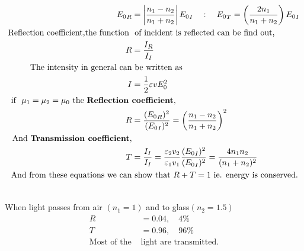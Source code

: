 \begin{align}
{E_0}_R&=\left| \frac{n_1-n_2}{n_1+n_2}\right| {E_0}_I\quad:\quad {E_0}_T=\left(\frac{2n_1}{n_1+n_2} \right) {E_0}_I\\
\text{Reflection coefficient,the function }&\text{ of incident is reflected can be find out,}\\
R&=\frac{I_R}{I_I}\\
\text{The intensity in general can}&\text{ be written as}\\
I&=\frac{1}{2}\varepsilon v E_0^2\\
\text{if \ $ \mu_{1}=\mu_{2}=\mu_{0} $ the \textbf{Reflection }}&\textbf{coefficient},\\
R&=\frac{({E_0}_R)^2}{({E_0}_I)^2}=\left(\frac{n_1-n_2}{n_1+n_2} \right)^2 \\ 
\text{And \textbf{Transmission coefficient},}\\
T&=\frac{I_I}{I_I}=\frac{\varepsilon_2v_2}{\varepsilon_1v_1}\frac{({E_0}_I)^2}{({E_0}_I)^2}=\frac{4n_1n_2}{(n_1+n_2)^2}\\
\text{And from these equations we can}&\text{ show that $R+T=1$ ie. energy is conserved.}\notag
\end{align}
\hspace{5.10cm}

\begin{note}\\\vspace{0.5cm}
	When light passes from air $(n_1=1)$ and to glass$(n_2=1.5)$
	\begin{align*}
	R&=0.04,\quad4\%\\
	T&=0.96, \quad96\%\\
	\text{Most of the }&\text{light  are transmitted.}
	\end{align*}
\end{note}
